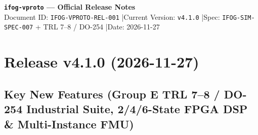 \documentclass[11pt,a4paper]{article}
\newcommand{\DocID}{IFOG-VPROTO-REL-001}
\newcommand{\DocVersion}{v4.1.0}
\newcommand{\DocDate}{2026-11-27}
\begin{document}
\small

\begin{tcolorbox}[colback=NavyBlue,colframe=NavyBlue,arc=4pt,boxrule=0pt,left=12pt,right=12pt,top=9pt,bottom=9pt]
{\color{white}\Large\bfseries \texttt{ifog-vproto} --- Official Release Notes}\\[3pt]
{\color{white}\small Document ID: \texttt{\DocID} \quad|\quad Current Version: \texttt{\DocVersion} \quad|\quad Spec: \texttt{IFOG-SIM-SPEC-007} + TRL 7--8 / DO-254 \quad|\quad Date: \DocDate}
\end{tcolorbox}

\section{Release v4.1.0 (2026-11-27)}

\subsection{Key New Features (Group E TRL 7--8 / DO-254 Industrial Suite, 2/4/6-State FPGA DSP \& Multi-Instance FMU)}
\end{document}
